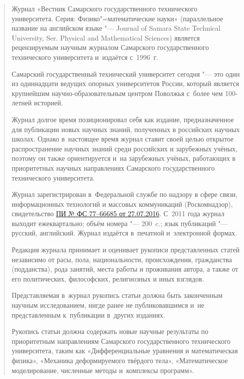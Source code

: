 \begin{abstract}

Журнал «Вестник Самарского государственного технического университета. Серия: Физико"=математические науки» (параллельное название на английском языке "--- Journal of Samara State Technical University, Ser. Physical and Mathematical Sciences) является рецензируемым научным журналом Самарского государственного технического университета и~издаётся с~1996~г.



Самарский государственный технический университет сегодня "--- это один из одиннадцати ведущих опорных университетов России, который является крупнейшим научно-образовательным центром Поволжья с~более чем 100-летней историей.



Журнал долгое время позиционировал себя как издание, предназначенное для публикации новых научных знаний, полученных в российских научных школах. Однако в~настоящее время журнал ставит своей целью открытое распространение научных знаний среди российских и зарубежных учёных, поэтому он также ориентируется и~на зарубежных учёных, работающих в приоритетных научных направлениях Самарского государственного технического университета.



Журнал зарегистрирован в~Федеральной службе по надзору в сфере связи, информационных технологий и массовых коммуникаций (Роскомнадзор), свидетельство \href{https://rkn.gov.ru/mass-communications/reestr/media/?id=83010}{ПИ № ФС 77–66685 от 27.07.2016}. С~2011 года журнал выходит ежеквартально; объём номера "--- 200~c.; язык публикаций "--- русский, английский. Журнал издаётся в~печатной и~электронной формах.



Редакция журнала принимает и оценивает рукописи представленных статей независимо от расы, пола, национальности, происхождения, гражданства (подданства), рода занятий, места работы и проживания автора, а также от его политических, философских, религиозных и иных взглядов.



Представляемая в~журнал рукопись статьи должна быть законченным научным исследованием, нигде ранее не публиковавшимся и~не представленным к~публикации в~других изданиях.



Рукопись статьи должна содержать новые научные результаты по приоритетным направлениям Самарского государственного технического университета, таким как «Дифференциальные уравнения и математическая физика», «Механика деформируемого твёрдого тела», «Математическое моделирование, численные методы и~комплексы программ».




\end{abstract}
